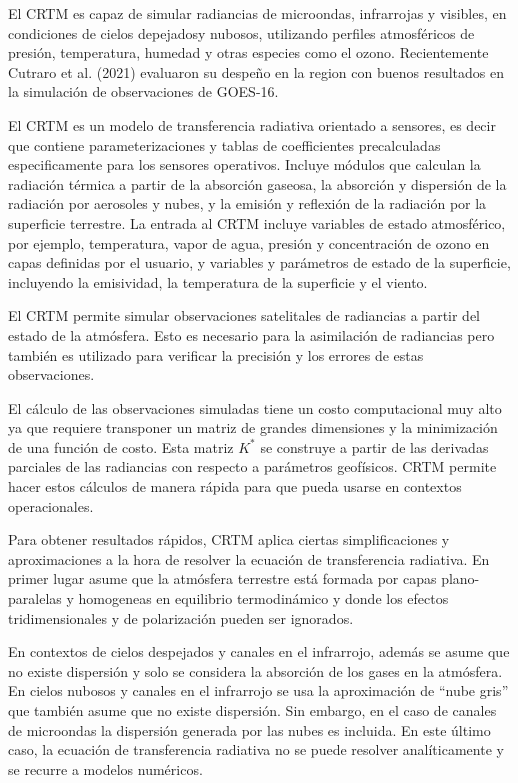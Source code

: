 \documentclass[12pt,oneside,a4paper]{reedthesis}
\begin{document}
El CRTM es capaz de simular radiancias de microondas, infrarrojas y visibles, en condiciones de cielos depejadosy nubosos, utilizando perfiles atmosféricos de presión, temperatura, humedad y otras especies como el ozono. Recientemente Cutraro et al. (2021) evaluaron su despeño en la region con buenos resultados en la simulación de observaciones de GOES-16.

El CRTM es un modelo de transferencia radiativa orientado a sensores, es decir que contiene parameterizaciones y tablas de coefficientes precalculadas especificamente para los sensores operativos. Incluye módulos que calculan la radiación térmica a partir de la absorción gaseosa, la absorción y dispersión de la radiación por aerosoles y nubes, y la emisión y reflexión de la radiación por la superficie terrestre. La entrada al CRTM incluye variables de estado atmosférico, por ejemplo, temperatura, vapor de agua, presión y concentración de ozono en capas definidas por el usuario, y variables y parámetros de estado de la superficie, incluyendo la emisividad, la temperatura de la superficie y el viento.

El CRTM permite simular observaciones satelitales de radiancias a partir del estado de la atmósfera. Esto es necesario para la asimilación de radiancias pero también es utilizado para verificar la precisión y los errores de estas observaciones.

El cálculo de las observaciones simuladas tiene un costo computacional muy alto ya que requiere transponer un matriz de grandes dimensiones y la minimización de una función de costo. Esta matriz \(K^{*}\) se construye a partir de las derivadas parciales de las radiancias con respecto a parámetros geofísicos. CRTM permite hacer estos cálculos de manera rápida para que pueda usarse en contextos operacionales.

Para obtener resultados rápidos, CRTM aplica ciertas simplificaciones y aproximaciones a la hora de resolver la ecuación de transferencia radiativa. En primer lugar asume que la atmósfera terrestre está formada por capas plano-paralelas y homogeneas en equilibrio termodinámico y donde los efectos tridimensionales y de polarización pueden ser ignorados.

En contextos de cielos despejados y canales en el infrarrojo, además se asume que no existe dispersión y solo se considera la absorción de los gases en la atmósfera. En cielos nubosos y canales en el infrarrojo se usa la aproximación de ``nube gris'' que también asume que no existe dispersión. Sin embargo, en el caso de canales de microondas la dispersión generada por las nubes es incluida. En este último caso, la ecuación de transferencia radiativa no se puede resolver analíticamente y se recurre a modelos numéricos.
\end{document}

